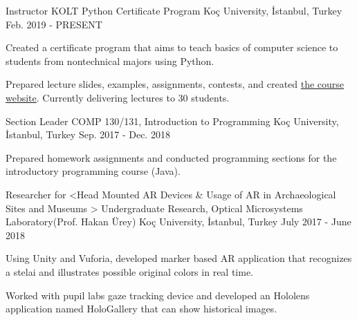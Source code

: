 
\vspace*{-1.5mm}
\begin{cventries}

  \cventry
    {Instructor}
    {KOLT Python Certificate Program}
    {Koç University, İstanbul, Turkey}
    {Feb. 2019 - PRESENT}
    {
      \begin{cvitems}
        \item {Created a certificate program that aims to teach basics of computer science to students from nontechnical majors using Python.}
        \item {Prepared lecture slides, examples, assignments, contests, and created \href{https://koltpython.github.io}{the course website}. Currently delivering lectures to 30 students.}
      \end{cvitems}
    }

  \cventry
    {Section Leader}%
    {COMP 130/131, Introduction to Programming}%
    {Koç University, İstanbul, Turkey}
    {Sep. 2017 - Dec. 2018}
    {
      \begin{cvitems}
        \item {Prepared homework assignments and conducted programming sections for the introductory programming course (Java).}
      \end{cvitems}
    }


  \cventry
    {Researcher for <Head Mounted AR Devices \& Usage of AR in Archaeological Sites and Museums >}%
     {Undergraduate Research, Optical Microsystems Laboratory(Prof. Hakan Ürey)}%
    {Koç University, İstanbul, Turkey}
    {July 2017 - June 2018}
    {
      \begin{cvitems} 
        \item {Using Unity and Vuforia, developed marker based AR application that recognizes a stelai and illustrates possible original colors in real time.}
	      \item {Worked with pupil labs gaze tracking device and developed an Hololens application named HoloGallery that can show historical images.}
      \end{cvitems} 
    }

\end{cventries}
